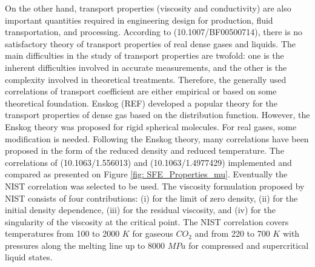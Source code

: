 \documentclass[../Article_Model_Parameters.tex]{subfiles}
\begin{document}
        On the other hand, transport properties (viscosity and conductivity) are also important quantities required in engineering design for production, fluid transportation, and processing. According to (10.1007/BF00500714), there is no satisfactory theory of transport properties of real dense gases and liquids. The main difficulties in the study of transport properties are twofold: one is the inherent difficulties involved in accurate measurements, and the other is the complexity involved in theoretical treatments. Therefore, the generally used correlations of transport coefficient are either empirical or based on some theoretical foundation. Enskog (REF) developed a popular theory for the transport properties of dense gas based on the distribution function. However, the Enskog theory was proposed for rigid spherical molecules. For real gases, some modification is needed. Following the Enskog theory, many correlations have been proposed in the form of the reduced density and reduced temperature. The correlations of (10.1063/1.556013) and (10.1063/1.4977429) implemented and compared as presented on Figure \ref{fig: SFE_Properties_mu}. Eventually the NIST correlation was selected to be used. The viscosity formulation proposed by NIST consists of four contributions: (i) for the limit of zero density, (ii) for the initial density dependence, (iii) for the residual viscosity, and (iv) for the singularity of the viscosity at the critical point. The NIST correlation covers temperatures from 100 to 2000 $K$ for gaseous $CO_2$ and from 220 to 700 $K$ with pressures along the melting line up to 8000 $MPa$ for compressed and supercritical liquid states. 
			
\end{document}
